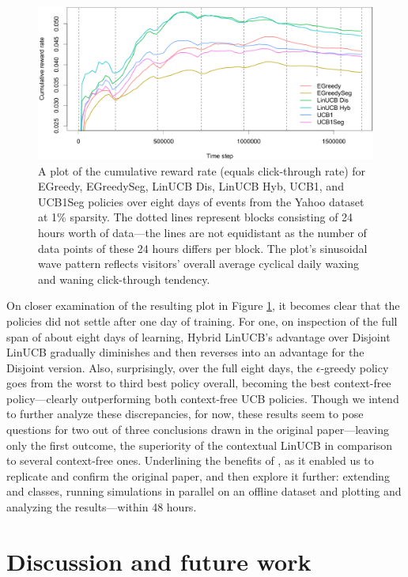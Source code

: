 \documentclass{jss}
\begin{document}
\begin{figure}[H]
  \centering
    \includegraphics[width=.99\textwidth]{fig/section_8_plot}
      \caption{A plot of the cumulative reward rate (equals click-through rate) for EGreedy, EGreedySeg, LinUCB Dis, LinUCB Hyb, UCB1, and UCB1Seg policies over eight days of events from the Yahoo dataset at 1\% sparsity. The dotted lines represent blocks consisting of 24 hours worth of data---the lines are not equidistant as the number of data points of these 24 hours differs per block. The plot's sinusoidal wave pattern reflects visitors' overall average cyclical daily waxing and waning click-through tendency.}
      \label{fig:section_8_plot}
\end{figure}

On closer examination of the resulting plot in Figure \ref{fig:section_8_plot}, it becomes clear that the policies did not settle after one day of training. For one, on inspection of the full span of about eight days of learning, Hybrid LinUCB's advantage over Disjoint LinUCB gradually diminishes and then reverses into an advantage for the Disjoint version. Also, surprisingly, over the full eight days, the $\epsilon$-greedy policy goes from the worst to third best policy overall, becoming the best context-free policy---clearly outperforming both context-free UCB policies. Though we intend to further analyze these discrepancies, for now, these results seem to pose questions for two out of three conclusions drawn in the original paper---leaving only the first outcome, the superiority of the contextual LinUCB in comparison to several context-free ones.  Underlining the benefits of , as it enabled us to replicate and confirm the original \cite{Li2010} paper, and then explore it further: extending  and  classes, running simulations in parallel on an offline dataset and plotting and analyzing the results---within 48 hours.

\section{Discussion and future work} \label{future}
\end{document}

